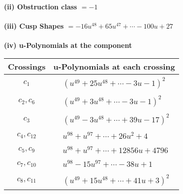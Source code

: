 \documentclass[1p]{elsarticle_modified}
\theoremstyle{definition}
\begin{document}
\flushleft \textbf{(ii) Obstruction class $= -1$}\\~\\
\flushleft \textbf{(iii) Cusp Shapes $= -16 u^{48}+65 u^{47}+\cdots-100 u+27$}\\~\\
\newpage\renewcommand{\arraystretch}{1}
\flushleft \textbf{(iv) u-Polynomials at the component}\newline \\
\begin{tabular}{m{50pt}|m{274pt}}
Crossings & \hspace{64pt}u-Polynomials at each crossing \\
\hline $$\begin{aligned}c_{1}\end{aligned}$$&$\begin{aligned}
&(u^{49}+25 u^{48}+\cdots-3 u-1)^{2}
\end{aligned}$\\
\hline $$\begin{aligned}c_{2},c_{6}\end{aligned}$$&$\begin{aligned}
&(u^{49}+3 u^{48}+\cdots-3 u-1)^{2}
\end{aligned}$\\
\hline $$\begin{aligned}c_{3}\end{aligned}$$&$\begin{aligned}
&(u^{49}-3 u^{48}+\cdots+39 u-17)^{2}
\end{aligned}$\\
\hline $$\begin{aligned}c_{4},c_{12}\end{aligned}$$&$\begin{aligned}
&u^{98}+u^{97}+\cdots+26 u^2+4
\end{aligned}$\\
\hline $$\begin{aligned}c_{5},c_{9}\end{aligned}$$&$\begin{aligned}
&u^{98}+u^{97}+\cdots+12856 u+4796
\end{aligned}$\\
\hline $$\begin{aligned}c_{7},c_{10}\end{aligned}$$&$\begin{aligned}
&u^{98}-15 u^{97}+\cdots-38 u+1
\end{aligned}$\\
\hline $$\begin{aligned}c_{8},c_{11}\end{aligned}$$&$\begin{aligned}
&(u^{49}+15 u^{48}+\cdots+41 u+3)^{2}
\end{aligned}$\\
\hline
\end{tabular}\\~\\
\end{document}
